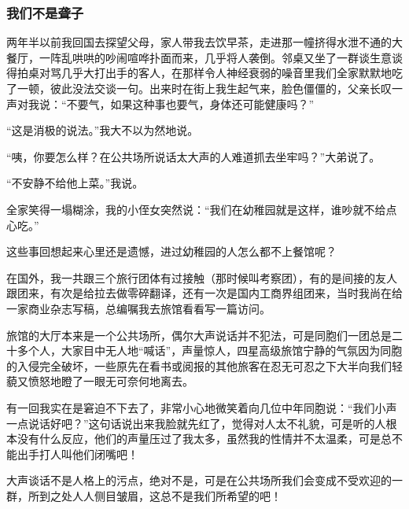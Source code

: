 \subsubsection*{我们不是聋子}
\par 两年半以前我回国去探望父母，家人带我去饮早茶，走进那一幢挤得水泄不通的大餐厅，一阵乱哄哄的吵闹喧哗扑面而来，几乎将人袭倒。邻桌又坐了一群谈生意谈得拍桌对骂几乎大打出手的客人，在那样令人神经衰弱的噪音里我们全家默默地吃了一顿，彼此没法交谈一句。出来时在街上我生起气来，脸色僵僵的，父亲长叹一声对我说：“不要气，如果这种事也要气，身体还可能健康吗？”
\par “这是消极的说法。”我大不以为然地说。
\par “咦，你要怎么样？在公共场所说话太大声的人难道抓去坐牢吗？”大弟说了。
\par “不安静不给他上菜。”我说。
\par 全家笑得一塌糊涂，我的小侄女突然说：“我们在幼稚园就是这样，谁吵就不给点心吃。”
\par 这些事回想起来心里还是遗憾，进过幼稚园的人怎么都不上餐馆呢？
\par 在国外，我一共跟三个旅行团体有过接触（那时候叫考察团），有的是间接的友人跟团来，有次是给拉去做零碎翻译，还有一次是国内工商界组团来，当时我尚在给一家商业杂志写稿，总编嘱我去旅馆看看写一篇访问。
\par 旅馆的大厅本来是一个公共场所，偶尔大声说话并不犯法，可是同胞们一团总是二十多个人，大家目中无人地“喊话”，声量惊人，四星高级旅馆宁静的气氛因为同胞的入侵完全破坏，一些原先在看书或阅报的其他旅客在忍无可忍之下大半向我们轻藐又愤怒地瞪了一眼无可奈何地离去。
\par 有一回我实在是窘迫不下去了，非常小心地微笑着向几位中年同胞说：“我们小声一点说话好吧？”这句话说出来我脸就先红了，觉得对人太不礼貌，可是听的人根本没有什么反应，他们的声量压过了我太多，虽然我的性情并不太温柔，可是总不能出手打人叫他们闭嘴吧！
\par 大声谈话不是人格上的污点，绝对不是，可是在公共场所我们会变成不受欢迎的一群，所到之处人人侧目皱眉，这总不是我们所希望的吧！
